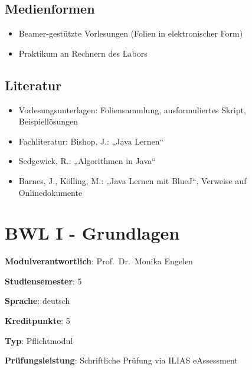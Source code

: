 \hypertarget{medienformenpathlabelmi-2017modulbeschreibungen-bachelorba_algorithmenundprogrammierung2}{%
\section*{Medienformen\label{/mi-2017/modulbeschreibungen-bachelor/BA_AlgorithmenundProgrammierung2}}\label{medienformenpathlabelmi-2017modulbeschreibungen-bachelorba_algorithmenundprogrammierung2}}

\begin{itemize}
\tightlist
\item
  Beamer-gestützte Vorlesungen (Folien in elektronischer Form)
\item
  Praktikum an Rechnern des Labors
\end{itemize}

\hypertarget{literaturpathlabelmi-2017modulbeschreibungen-bachelorba_algorithmenundprogrammierung2}{%
\section*{Literatur\label{/mi-2017/modulbeschreibungen-bachelor/BA_AlgorithmenundProgrammierung2}}\label{literaturpathlabelmi-2017modulbeschreibungen-bachelorba_algorithmenundprogrammierung2}}

\begin{itemize}
\tightlist
\item
  Vorlesungsunterlagen: Foliensammlung, ausformuliertes Skript,
  Beispiellösungen
\item
  Fachliteratur: Bishop, J.: „Java Lernen``
\item
  Sedgewick, R.: „Algorithmen in Java``
\item
  Barnes, J., Kölling, M.: „Java Lernen mit BlueJ``, Verweise auf
  Onlinedokumente
\end{itemize}

\hypertarget{bwl-i---grundlagenpathlabelmi-2017modulbeschreibungen-bachelorba_bwl1}{%
\chapter{BWL I -
Grundlagen\label{/mi-2017/modulbeschreibungen-bachelor/BA_BWL1}}\label{bwl-i---grundlagenpathlabelmi-2017modulbeschreibungen-bachelorba_bwl1}}

\begin{modulHead}
\textbf{Modulverantwortlich}: Prof.~Dr.~Monika
Engelen
\end{modulHead}
\begin{modulHead}
\textbf{Studiensemester}:
5
\end{modulHead}
\begin{modulHead}
\textbf{Sprache}:
deutsch
\end{modulHead}
\begin{modulHead}
\textbf{Kreditpunkte}:
5
\end{modulHead}
\begin{modulHead}
\textbf{Typ}:
Pflichtmodul
\end{modulHead}
\begin{modulHead}
\textbf{Prüfungsleistung}:
Schriftliche Prüfung via ILIAS eAssessment
\end{modulHead}


